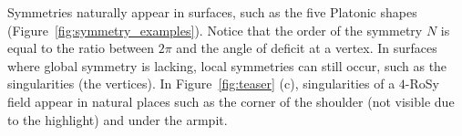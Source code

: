 \documentclass{acmsiggraph}               %
\begin{document}
Symmetries naturally appear in surfaces, such as the five Platonic
shapes (Figure~\ref{fig:symmetry_examples}). Notice that the order
of the symmetry $N$ is equal to the ratio between $2\pi$ and the
angle of deficit at a vertex. In surfaces where global symmetry is
lacking, local symmetries can still occur, such as the singularities
(the vertices). In Figure~\ref{fig:teaser} (c), singularities of a
$4$-RoSy field appear in natural places such as the corner of the
shoulder (not visible due to the highlight) and under the armpit.

\end{document}
